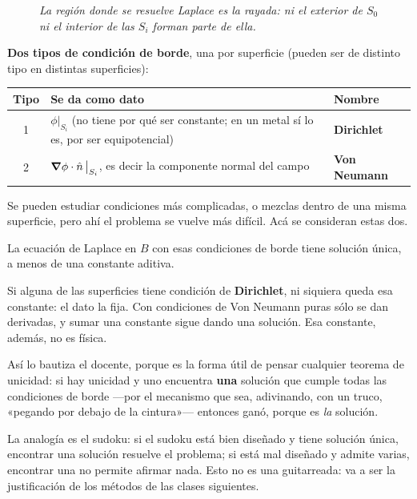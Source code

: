 \documentclass[12pt,a4paper]{article}
\begin{document}
\begin{figure}[H]
  \centering
  
  \caption*{\small\itshape La región donde se resuelve Laplace es la rayada: ni
  el exterior de $S_0$ ni el interior de las $S_i$ forman parte de ella.}
\end{figure}

\textbf{Dos tipos de condición de borde}, una por superficie (pueden ser de
distinto tipo en distintas superficies):

\begin{table}[H]
  \centering
  \begin{tabularx}{\textwidth}{@{}c X l@{}}
    \toprule
    \textbf{Tipo} & \textbf{Se da como dato} & \textbf{Nombre} \\
    \midrule
    1 & $\phi\big|_{S_i}$ (no tiene por qué ser constante; en un metal sí lo es,
        por ser equipotencial) & \textbf{Dirichlet} \\[0.4em]
    2 & $\grad\phi\cdot\hat n\,\big|_{S_i}$, es decir la componente normal del
        campo & \textbf{Von Neumann} \\
    \bottomrule
  \end{tabularx}
\end{table}

\begin{notebox}[Alcance]
Se pueden estudiar condiciones más complicadas, o mezclas dentro de una misma
superficie, pero ahí el problema se vuelve más difícil. Acá se consideran estas
dos.
\end{notebox}

\begin{keybox}
La ecuación de Laplace en $B$ con esas condiciones de borde tiene solución única,
a menos de una constante aditiva.
\end{keybox}

Si alguna de las superficies tiene condición de \textbf{Dirichlet}, ni siquiera
queda esa constante: el dato la fija. Con condiciones de Von Neumann puras sólo se
dan derivadas, y sumar una constante sigue dando una solución. Esa constante,
además, no es física.

\begin{notebox}
Así lo bautiza el docente, porque es la forma útil de pensar cualquier teorema de
unicidad: si hay unicidad y uno encuentra \textbf{una} solución que cumple todas
las condiciones de borde ---por el mecanismo que sea, adivinando, con un truco,
«pegando por debajo de la cintura»--- entonces ganó, porque es \emph{la} solución.

La analogía es el sudoku: si el sudoku está bien diseñado y tiene solución única,
encontrar una solución resuelve el problema; si está mal diseñado y admite varias,
encontrar una no permite afirmar nada. Esto no es una guitarreada: va a ser la
justificación de los métodos de las clases siguientes.
\end{notebox}
\end{document}
